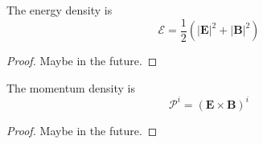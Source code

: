     The energy density is 
    \begin{equation*}
        \mathcal E = \frac{1}{2} (|\mathbf E|^2 + |\mathbf B|^2)
    \end{equation*}

    \begin{proof}
        Maybe in the future.
    \end{proof}

    The momentum density is 
    \begin{equation*}
        \mathcal P^i = (\mathbf E \times \mathbf B)^i
    \end{equation*}

    \begin{proof}
        Maybe in the future.
    \end{proof}

